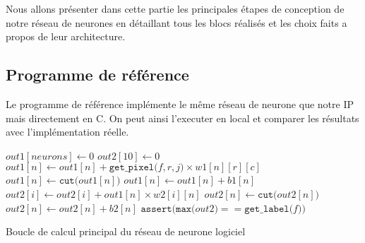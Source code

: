 
Nous allons présenter dans cette partie les principales étapes de conception
de notre réseau de neurones en détaillant tous les blocs réalisés et les choix
faits a propos de leur architecture.

\subsection{Programme de référence}
Le programme de référence implémente le même réseau de neurone que notre IP
mais directement en C. On peut ainsi l'executer en local et comparer les résultats
avec l'implémentation réelle.

\begin{algorithm}
	\SetAlgoLined
	 {
		$out1[neurons] \leftarrow 0$\;
		$out2[10] \leftarrow 0$\;
		 {
			 {
				 {
					$out1[n] \leftarrow out1[n] + \texttt{get\_pixel(}f, r, j\texttt{)} \times w1[n][r][c]$\;
				}
			}
		}
		 {
			$out1[n] \leftarrow \texttt{cut(}out1[n]\texttt{)}$\;
			$out1[n] \leftarrow out1[n] + b1[n]$\;
		}
		 {
			 {
				$out2[i] \leftarrow out2[i] + out1[n] \times w2[i][n]$\;
			}
		}
		 {
			$out2[n] \leftarrow \texttt{cut(}out2[n]\texttt{)}$\;
			$out2[n] \leftarrow out2[n] + b2[n]$\;
		}
		$\texttt{assert(max(}out2\texttt{)} == \texttt{get\_label(}f\texttt{))}$\;
	}
	\caption{Boucle de calcul principal du réseau de neurone logiciel}
	\label{soft_nn}
\end{algorithm}

